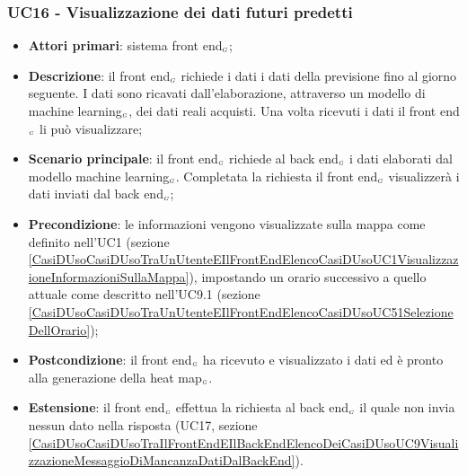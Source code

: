 \subsubsection{UC16 - Visualizzazione dei dati futuri predetti}\label{CasiDUsoCasiDUsoTraIlFrontEndEIlBackEndElencoDeiCasiDUsoUC83VisualizzazioneDeiDatiPredetti}
\begin{itemize}
	\item \textbf{Attori primari}: sistema front end$_{\scaleto{G}{3pt}}$;
	\item \textbf{Descrizione}: il front end$_{\scaleto{G}{3pt}}$ richiede i dati i dati della previsione fino al giorno seguente.
	I dati sono ricavati dall’elaborazione, attraverso un modello di machine learning$_{\scaleto{G}{3pt}}$, dei dati reali acquisti. Una volta ricevuti i dati il front end$_{\scaleto{G}{3pt}}$ li può visualizzare;
	\item \textbf{Scenario principale}: il front end$_{\scaleto{G}{3pt}}$ richiede al back end$_{\scaleto{G}{3pt}}$ i dati elaborati dal modello machine learning$_{\scaleto{G}{3pt}}$. Completata la richiesta il front end$_{\scaleto{G}{3pt}}$ visualizzerà i dati inviati dal back end$_{\scaleto{G}{3pt}}$;
	\item \textbf{Precondizione}: le informazioni vengono visualizzate sulla mappa come definito nell’UC1 (sezione \ref{CasiDUsoCasiDUsoTraUnUtenteEIlFrontEndElencoCasiDUsoUC1VisualizzazioneInformazioniSullaMappa}), impostando un orario successivo a quello attuale come descritto nell’UC9.1 (sezione \ref{CasiDUsoCasiDUsoTraUnUtenteEIlFrontEndElencoCasiDUsoUC51SelezioneDellOrario});
	\item \textbf{Postcondizione}: il front end$_{\scaleto{G}{3pt}}$ ha ricevuto e visualizzato i dati ed è pronto alla generazione della heat map$_{\scaleto{G}{3pt}}$.
	\item \textbf{Estensione}: il front end$_{\scaleto{G}{3pt}}$ effettua la richiesta al back end$_{\scaleto{G}{3pt}}$ il quale non invia nessun dato nella risposta (UC17, sezione \ref{CasiDUsoCasiDUsoTraIlFrontEndEIlBackEndElencoDeiCasiDUsoUC9VisualizzazioneMessaggioDiMancanzaDatiDalBackEnd}).
\end{itemize}


